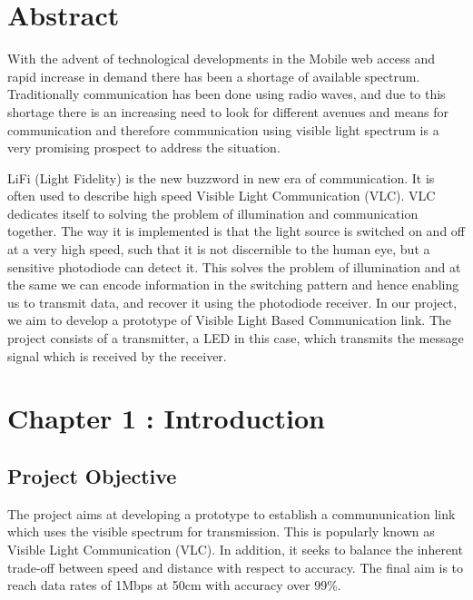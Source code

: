 \documentclass{article}
\begin{document}
\section{Abstract}
With the advent of technological developments in the Mobile web access and rapid increase in demand there has been a shortage of available spectrum. Traditionally communication has been done using radio waves, and due to this shortage there is an increasing need to look for different avenues and means for communication and therefore communication using visible light spectrum is a very promising prospect to address the situation. 

LiFi (Light Fidelity) is the new buzzword in new era of communication. It is often used to describe high speed Visible Light Communication (VLC). VLC dedicates itself to solving the problem of illumination and communication together. The way it is implemented is that the
light source is switched on and off at a very high speed, such that it is not discernible to the human eye, but a sensitive photodiode can detect it. This solves the problem of illumination and at the same we can encode information in the switching pattern and hence enabling us to transmit data, and recover it using the photodiode receiver. In our project, we aim to develop a prototype of Visible Light Based Communication link. The project consists of a transmitter, a LED in this case, which transmits the message signal which is received by the receiver.

\newpage
\tableofcontents
\newpage
\section{Chapter 1 : Introduction}
\subsection{Project Objective}
The project aims at developing a prototype to establish a commununication link which uses the visible spectrum for transmission. This is popularly known as Visible Light Communication (VLC). In addition, it seeks to balance the inherent trade-off between speed and distance with respect to accuracy. The final aim is to reach data rates of 1Mbps at 50cm with accuracy over 99\%.
\end{document}
